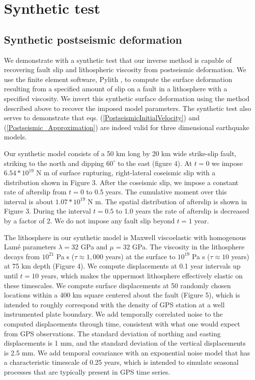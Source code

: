 \documentclass[extra,mreferee]{gji}
\begin{document}
\section{Synthetic test}
\subsection{Synthetic postseismic deformation}

We demonstrate with a synthetic test that our inverse method is
capable of recovering fault slip and lithospheric viscosity from
postseismic deformation.  We use the finite element software, Pylith
\citep{A2007}, to compute the surface deformation resulting from a
specified amount of slip on a fault in a lithosphere with a specified
viscosity.  We invert this synthetic surface deformation using the
method described above to recover the imposed model parameters.  The
synthetic test also serves to demonstrate that
eqs. (\ref{PostseismicInitialVelocity}) and
(\ref{Postseismic_Approximation}) are indeed valid for three
dimensional earthquake models.

Our synthetic model consists of a 50 km long by 20 km wide strike-slip
fault, striking to the north and dipping $60^{\circ}$ to the east (figure
4). At $t=0$ we impose $6.54*10^{19}$ N m of surface rupturing,
right-lateral coseismic slip with a distribution shown in Figure 3.
After the coseismic slip, we impose a constant rate of afterslip from
$t=0$ to 0.5 years.  The cumulative moment over this
interval is about $1.07*10^{19}$ N m.  The spatial distribution of
afterslip is shown in Figure 3.  During the interval $t=0.5$ to
1.0 years the rate of afterslip is decreased by a factor of 2.
We do not impose any fault slip beyond $t=1$ year.

The lithosphere in our synthetic model is Maxwell viscoelastic with
homogenous Lam\'e parameters $\lambda = 32$ GPa and $\mu = 32$
GPa.  The viscosity in the lithosphere decays from $10^{21}$ Pa s
($\tau\approx1,000$ years) at the surface to $10^{19}$ Pa s
($\tau\approx10$ years) at 75 km depth (Figure 4).  We compute
displacements at 0.1 year intervals up until $t=10$ years, which makes
the uppermost lithosphere effectively elastic on these timescales. We compute
surface displacements at 50 randomly chosen locations within a 400 km
square centered about the fault (Figure 5), which is intended to
roughly correspond with the density of GPS station at a well
instrumented plate boundary.  We add temporally correlated noise to
the computed displacements through time, consistent with what one would
expect from GPS observations.  The standard deviation of northing and
easting displacements is 1 mm, and the standard deviation of the
vertical displacements is 2.5 mm.  We add temporal covariance with an
exponential noise model that has a characteristic timescale of 0.25
years, which is intended to simulate seasonal processes that are
typically present in GPS time series.
\end{document}
